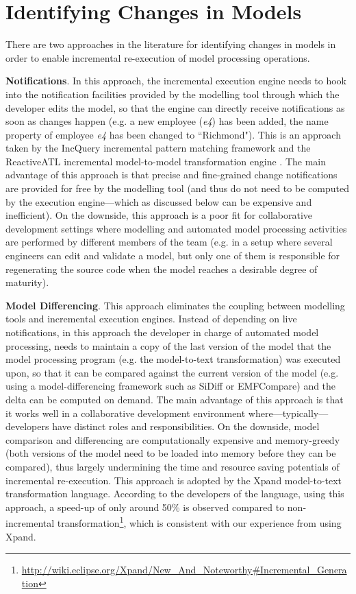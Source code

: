 \documentclass{llncs}
\begin{document}
\section{Identifying Changes in Models}
\label{Identifying Changes in Models}
There are two approaches in the literature for identifying changes in models in order to enable incremental re-execution of model processing operations.

\textbf{Notifications}. In this approach, the incremental execution engine needs to hook into the notification facilities provided by the modelling tool through which the developer edits the model, so that the engine can directly receive notifications as soon as changes happen (e.g. a new employee (\emph{e4}) has been added, the name property of employee \emph{e4} has been changed to ``Richmond"). This is an approach taken by the IncQuery incremental pattern matching framework \cite{rath2012derived} and the ReactiveATL incremental model-to-model transformation engine \cite{ogunyomi2015property}. The main advantage of this approach is that precise and fine-grained change notifications are provided for free by the modelling tool (and thus do not need to be computed by the execution engine---which as discussed below can be expensive and inefficient). On the downside, this approach is a poor fit for collaborative development settings
where modelling and automated model processing activities are performed by different members of the team (e.g. in a setup where several engineers can edit and validate a model, but only one of them is responsible for regenerating the source code when the model reaches a desirable degree of maturity).

\textbf{Model Differencing}. This approach eliminates the coupling between modelling tools and incremental execution engines. Instead of depending on live notifications, in this approach the developer in charge of automated model processing, needs to maintain a copy of the last version of the model that the model processing program (e.g. the model-to-text transformation) was executed upon, so that it can be compared against the current version of the model (e.g. using a model-differencing framework such as SiDiff or EMFCompare) and the delta can be computed on demand. The main advantage of this approach is that it works well in a collaborative development environment where---typically---developers have distinct roles and responsibilities. On the downside, model comparison and differencing are computationally expensive and memory-greedy (both versions of the model need to be loaded into memory before they can be compared), thus largely undermining the time and resource saving potentials of incremental re-execution. This approach is adopted by the Xpand model-to-text transformation language. According to the developers of the language, using this approach, a speed-up of only around 50\% is observed compared to non-incremental transformation\footnote{\url{http://wiki.eclipse.org/Xpand/New_And_Noteworthy\#Incremental_Generation}}, which is consistent with our experience from using Xpand.
\end{document}
